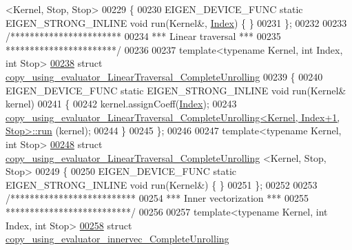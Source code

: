 \begin{DoxyCode}
      <Kernel, Stop, Stop>
00229 \{
00230   EIGEN\_DEVICE\_FUNC \textcolor{keyword}{static} EIGEN\_STRONG\_INLINE \textcolor{keywordtype}{void} run(Kernel&, \hyperlink{namespace_eigen_a62e77e0933482dafde8fe197d9a2cfde}{Index}) \{ \}
00231 \};
00232 
00233 \textcolor{comment}{/***********************}
00234 \textcolor{comment}{*** Linear traversal ***}
00235 \textcolor{comment}{***********************/}
00236 
00237 \textcolor{keyword}{template}<\textcolor{keyword}{typename} Kernel, \textcolor{keywordtype}{int} Index, \textcolor{keywordtype}{int} Stop>
\hyperlink{struct_eigen_1_1internal_1_1copy__using__evaluator___linear_traversal___complete_unrolling}{00238} \textcolor{keyword}{struct }\hyperlink{struct_eigen_1_1internal_1_1copy__using__evaluator___linear_traversal___complete_unrolling}{copy\_using\_evaluator\_LinearTraversal\_CompleteUnrolling}
00239 \{
00240   EIGEN\_DEVICE\_FUNC \textcolor{keyword}{static} EIGEN\_STRONG\_INLINE \textcolor{keywordtype}{void} run(Kernel& kernel)
00241   \{
00242     kernel.assignCoeff(\hyperlink{namespace_eigen_a62e77e0933482dafde8fe197d9a2cfde}{Index});
00243     
      \hyperlink{struct_eigen_1_1internal_1_1copy__using__evaluator___linear_traversal___complete_unrolling}{copy\_using\_evaluator\_LinearTraversal\_CompleteUnrolling<Kernel, Index+1, Stop>::run}
      (kernel);
00244   \}
00245 \};
00246 
00247 \textcolor{keyword}{template}<\textcolor{keyword}{typename} Kernel, \textcolor{keywordtype}{int} Stop>
\hyperlink{struct_eigen_1_1internal_1_1copy__using__evaluator___linear_traversal___complete_unrolling_3_01_c8b3cb7351f57cc3b8eaeb07b20f5de4}{00248} \textcolor{keyword}{struct }\hyperlink{struct_eigen_1_1internal_1_1copy__using__evaluator___linear_traversal___complete_unrolling}{copy\_using\_evaluator\_LinearTraversal\_CompleteUnrolling}
      <Kernel, Stop, Stop>
00249 \{
00250   EIGEN\_DEVICE\_FUNC \textcolor{keyword}{static} EIGEN\_STRONG\_INLINE \textcolor{keywordtype}{void} run(Kernel&) \{ \}
00251 \};
00252 
00253 \textcolor{comment}{/**************************}
00254 \textcolor{comment}{*** Inner vectorization ***}
00255 \textcolor{comment}{**************************/}
00256 
00257 \textcolor{keyword}{template}<\textcolor{keyword}{typename} Kernel, \textcolor{keywordtype}{int} Index, \textcolor{keywordtype}{int} Stop>
\hyperlink{struct_eigen_1_1internal_1_1copy__using__evaluator__innervec___complete_unrolling}{00258} \textcolor{keyword}{struct }\hyperlink{struct_eigen_1_1internal_1_1copy__using__evaluator__innervec___complete_unrolling}{copy\_using\_evaluator\_innervec\_CompleteUnrolling}

\end{DoxyCode}
